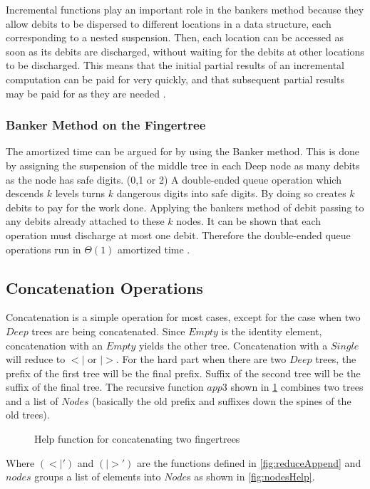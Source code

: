 Incremental functions play an important role in the bankers method because
they allow debits to be dispersed to different locations in a data structure,
each corresponding to a nested suspension. Then, each location can be accessed
as soon as its debits are discharged, without waiting for the debits at other
locations to be discharged. This means that the initial partial results of
an incremental computation can be paid for very quickly, and that subsequent
partial results may be paid for as they are needed \cite{Okasaki1999}.

\subsubsection{Banker Method on the Fingertree}
The amortized time can be argued for by using the Banker method.
This is done by assigning the suspension of the middle tree in each Deep node
as many debits as the node has safe digits. (0,1 or 2) A double-ended queue
operation which descends $k$ levels turns $k$ dangerous digits into safe digits.
By doing so creates $k$ debits to pay for the work done.
Applying the bankers method of debit passing to any debits already attached to
these $k$ nodes. It can be shown that each operation must discharge at most
one debit. Therefore the double-ended queue operations run in $\Theta(1)$
amortized time \cite{fingertree}.


\subsection{Concatenation Operations}
Concatenation is a simple operation for most cases, except for the case when two
$Deep$ trees are being concatenated. Since $Empty$ is the identity element,
concatenation with an $Empty$ yields the other tree. Concatenation with a
$Single$ will reduce to $<|$ or $|>$. For the hard part when there are two
$Deep$ trees, the prefix of the first tree will be the final prefix. Suffix of
the second tree will be the suffix of the final tree. The recursive function
$app3$ shown in \cref{fig:concatHelp} combines two trees and a list of $Nodes$
(basically the old prefix and suffixes down the spines of the old trees).

\begin{figure}[h!]

\caption{Help function for concatenating two fingertrees \label{fig:concatHelp}}
\end{figure}

Where $(<|')$ and $(|>')$ are the functions defined in \cref{fig:reduceAppend}
and $nodes$ groups a list of elements into $Node$s as shown in
\cref{fig:nodesHelp}. 

